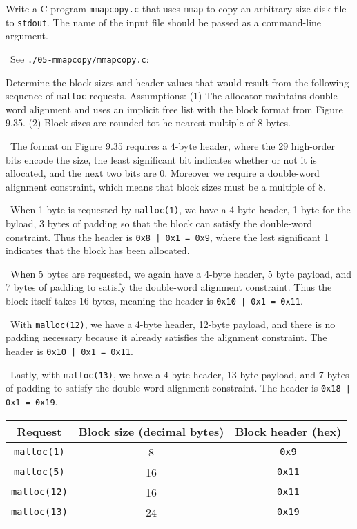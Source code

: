 \documentclass[12pt]{article}
\newenvironment{ex}[2][Exercise]{\begin{trivlist}
		\item[\hskip \labelsep {\bfseries #1}\hskip \labelsep {\bfseries #2.}]}{\end{trivlist}}
\newenvironment{sol}[1][Solution]{\begin{trivlist}
		\item[\hskip \labelsep {\bfseries #1:}]}{\end{trivlist}}
\begin{document}
\begin{ex}{9.5}
	Write a C program \texttt{mmapcopy.c} that uses \texttt{mmap} to copy an arbitrary-size
	disk file to \texttt{stdout}. The name of the input file should be passed as a command-line
	argument.
\end{ex}

\begin{sol}
	\
	See \texttt{./05-mmapcopy/mmapcopy.c}:
	
\end{sol}

\begin{ex}{9.6}
	Determine the block sizes and header values that would result from the following sequence
	of \texttt{malloc} requests. Assumptions: (1) The allocator maintains double-word alignment
	and uses an implicit free list with the block format from Figure 9.35. (2) Block sizes
	are rounded tot he nearest multiple of 8 bytes.
\end{ex}

\begin{sol}
	\
	The format on Figure 9.35 requires a 4-byte header, where the 29 high-order bits encode
	the size, the least significant bit indicates whether or not it is allocated,
	and the next two bits are 0. Moreover we require a double-word alignment constraint,
	which means that block sizes must be a multiple of 8.
	
	\
	When 1 byte is requested by \texttt{malloc(1)}, we have a 4-byte header, 1 byte for the byload,
	3 bytes of padding so that the block can satisfy the double-word constraint. Thus the header is
	\texttt{0x8 | 0x1 = 0x9}, where the lest significant 1 indicates that the block has been allocated.
	
	\
	When 5 bytes are requested, we again have a 4-byte header, 5 byte payload, and 7 bytes
	of padding to satisfy the double-word alignment constraint. Thus the block itself
	takes 16 bytes, meaning the header is \texttt{0x10 | 0x1 = 0x11}.
	
	\
	With \texttt{malloc(12)}, we have a 4-byte header, 12-byte payload, and there is no
	padding necessary because it already satisfies the alignment constraint. The
	header is \texttt{0x10 | 0x1 = 0x11}.
	
	\
	Lastly, with \texttt{malloc(13)}, we have a 4-byte header, 13-byte payload, and
	7 bytes of padding to satisfy the double-word alignment constraint. The
	header is \texttt{0x18 | 0x1 = 0x19}.
	\begin{center}
		\begin{tabular}{ccc}
			Request & Block size (decimal bytes) & Block header (hex)\\
			\hline
			\texttt{malloc(1)} & 8 & \texttt{0x9}\\
			\texttt{malloc(5)} & 16 & \texttt{0x11}\\
			\texttt{malloc(12)} & 16 & \texttt{0x11}\\
			\texttt{malloc(13)} & 24 & \texttt{0x19}\\
		\end{tabular}
	\end{center}
\end{sol}
\end{document}
